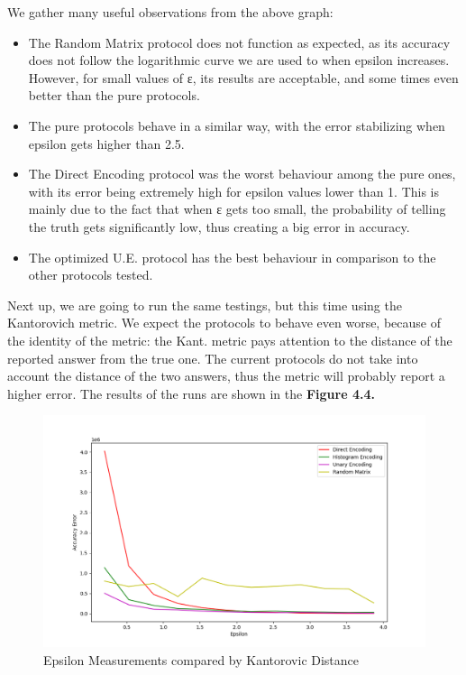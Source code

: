We gather many useful observations from the above graph:

\begin{itemize}
    \item The Random Matrix protocol does not function as expected, as its accuracy does not follow the logarithmic curve we are used to when epsilon increases. However, for small values of ε, its results are acceptable, and some times even better than the pure protocols.
    \item The pure protocols behave in a similar way, with the error stabilizing when epsilon gets higher than 2.5. 
    \item The Direct Encoding protocol was the worst behaviour among the pure ones, with its error being extremely high for epsilon values lower than 1.  This is mainly due to the fact that when ε gets too small, the probability of telling the truth gets significantly low, thus creating a big error in accuracy.
    \item The optimized U.E. protocol has the best behaviour in comparison to the other protocols tested.
\end{itemize}

Next up, we are going to run the same testings, but this time using the Kantorovich metric. We expect the protocols to behave even worse, because of the identity of the metric: the Kant. metric pays attention to the distance of the reported answer from the true one. The current protocols do not take into account the distance of the two answers, thus the metric will probably report a higher error. The results of the runs are shown in the \textbf{Figure 4.4.}

\begin{figure}[!htb]\centering
    \includegraphics[width=1\textwidth]{images/epsilon_others_kant.png}
    \caption{Epsilon Measurements compared by Kantorovic Distance}
\end{figure}


